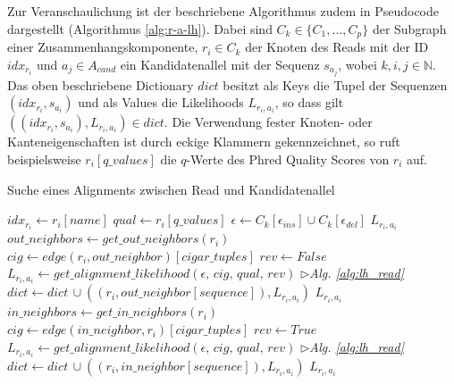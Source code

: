 Zur Veranschaulichung ist der beschriebene Algorithmus zudem in Pseudocode dargestellt (Algorithmus \ref{alg:r-a-lh}). Dabei sind $ C_{k} \in \{C_{1}, \dots ,C_{p}\} $ der Subgraph einer Zusammenhangskomponente, $ r_{i} \in C_{k} $ der Knoten des Reads mit der ID $ idx_{r_{i}}$ und $ a_{j} \in A_{cand} $ ein Kandidatenallel mit der Sequenz $ s_{a_{j}} $, wobei $ k,i,j \in \mathds{N} $. Das oben beschriebene Dictionary $dict$ besitzt als Keys die Tupel der Sequenzen $(idx_{r_{i}}, s_{a_{i}}) $ und als Values die Likelihoods $L_{r_{i}, a_{i}}$, so dass gilt $ ((idx_{r_{i}}, s_{a_{i}}), L_{r_{i}, a_{i}})  \in dict $. Die Verwendung fester Knoten- oder Kanteneigenschaften ist durch eckige Klammern gekennzeichnet, so ruft beispielsweise $r_{i}[q\_values]$ die $ q $-Werte des Phred Quality Scores von $r_{i}$ auf.\\

\renewcommand{\algorithmiccomment}[1]{\hfill$\triangleright$\textit{#1}}
\begin{algorithm}[H]
	\caption{Suche eines Alignments zwischen Read und Kandidatenallel} \label{alg:r-a-lh}
	\begin{algorithmic}[1]	
		\State $ idx_{r_{i}} \gets r_{i}[name]$
		\State $ qual \gets r_{i}[q\_values] $
		\State $ \epsilon \gets C_{k}[\epsilon_{ins}] \cup C_{k}[\epsilon_{del}] $
		\State \Return $ L_{r_{i}, a_{i}} $
		\EndIf		
		\State $ out\_neighbors \gets get\_out\_neighbors(r_{i})$
		\State $ cig \gets edge(r_{i}, out\_neighbor)[cigar\_tuples]$		
		\State $ rev \gets False $
		\State $ L_{r_{i}, a_{i}} \gets get\_alignment\_likelihood(\epsilon,\, cig,\, qual,\, rev)$
		\algorithmiccomment{Alg. \ref{alg:lh_read}}
		\State $ dict \gets dict \, \cup ((r_{i}, out\_neighbor[sequence]), L_{r_{i}, a_{i}})  $
		\State \Return $L_{r_{i}, a_{i}}$   
		\EndIf
		\EndFor		
		\State $ in\_neighbors \gets get\_in\_neighbors(r_{i})$		
		\State $ cig \gets edge(in\_neighbor, r_{i})[cigar\_tuples]$		
		\State $ rev \gets True $
		\State $ L_{r_{i}, a_{i}} \gets get\_alignment\_likelihood(\epsilon,\, cig,\, qual,\, rev)$
		\algorithmiccomment{Alg. \ref{alg:lh_read}}
		\State $ dict \gets dict \, \cup ((r_{i}, in\_neighbor[sequence]), L_{r_{i}, a_{i}})  $
		\State \Return $L_{r_{i}, a_{i}}$  
		\EndIf		
		\EndFor		
		\State {}
		\EndFunction
	\end{algorithmic}
\end{algorithm}

